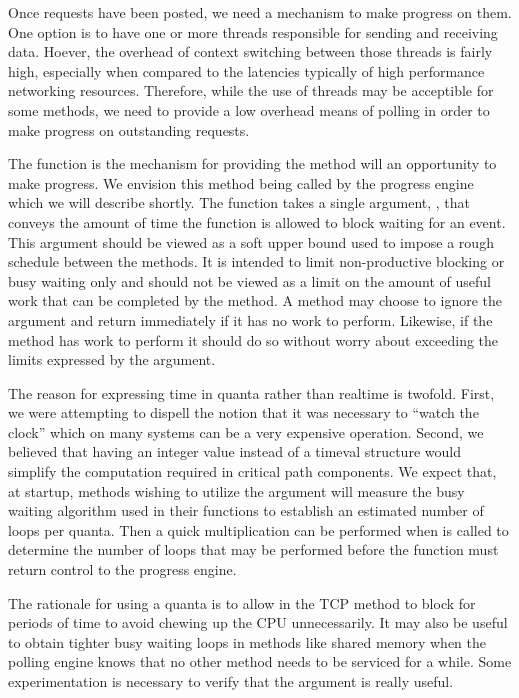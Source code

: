 Once requests have been posted, we need a mechanism to make progress on them.
One option is to have one or more threads responsible for sending and receiving
data.  Hoever, the overhead of context switching between those threads is
fairly high, especially when compared to the latencies typically of high
performance networking resources.  Therefore, while the use of threads may be
acceptible for some methods, we need to provide a low overhead means of polling
in order to make progress on outstanding requests.

The  function is the mechanism for providing the method will
an opportunity to make progress.  We envision this method being called by the
progress engine which we will describe shortly.  The  function takes
a single argument, , that conveys the amount of time the function
is allowed to block waiting for an event.  This argument should be viewed as a
soft upper bound used to impose a rough schedule between the methods.  It is
intended to limit non-productive blocking or busy waiting only and should not
be viewed as a limit on the amount of useful work that can be completed by the
method.  A method may choose to ignore the argument and return immediately if
it has no work to perform.  Likewise, if the method has work to perform it
should do so without worry about exceeding the limits expressed by the
 argument.

The reason for expressing time in quanta rather than realtime is twofold.
First, we were attempting to dispell the notion that it was necessary to
``watch the clock'' which on many systems can be a very expensive operation.
Second, we believed that having an integer value instead of a timeval structure
would simplify the computation required in critical path components.  We expect
that, at startup, methods wishing to utilize the  argument will
measure the busy waiting algorithm used in their  functions to
establish an estimated number of loops per quanta.  Then a quick multiplication
can be performed when  is called to determine the number of loops
that may be performed before the  function must return control to
the progress engine.

\begin{cmt}
  The rationale for using a quanta is to allow  in the TCP
  method to block for periods of time to avoid chewing up the CPU
  unnecessarily.  It may also be useful to obtain tighter busy waiting loops in
  methods like shared memory when the polling engine knows that no other method
  needs to be serviced for a while.  Some experimentation is necessary to
  verify that the  argument is really useful.
\end{cmt}

